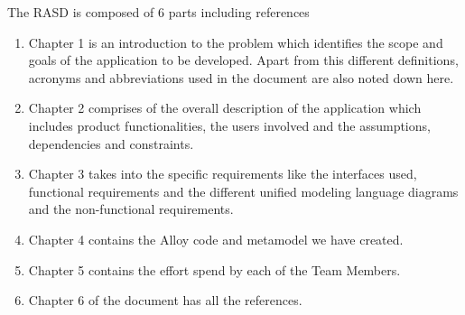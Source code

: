 \qquad The RASD is composed of 6 parts including references
\begin{enumerate}
\item Chapter 1 is an introduction to the problem which identifies the scope and goals of the application to be developed. Apart from this different definitions, acronyms and abbreviations used in the document are also noted down here.
\item Chapter 2 comprises of the overall description of the application which includes product functionalities, the users involved and the assumptions, dependencies and constraints.
\item Chapter 3 takes into the specific requirements like the interfaces used, functional requirements and the different unified modeling language diagrams and the non-functional requirements.
\item Chapter 4 contains the Alloy code and metamodel we have created.
\item Chapter 5 contains the effort spend by each of the Team Members.
\item Chapter 6 of the document has all the references.
\end{enumerate}